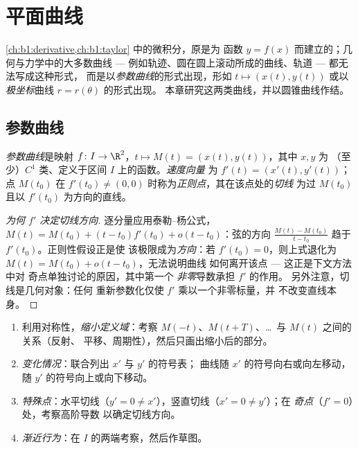 \chapter{平面曲线}\label{ch:b1:curves}

 \cref{ch:b1:derivative,ch:b1:taylor} 中的微积分，原是为
函数 $y = f(x)$ 而建立的；几何与力学中的大多数曲线 ---
例如轨迹、圆在圆上滚动所成的曲线、轨道 --- 都无法写成这种形式，
而是以\emph{参数曲线}的形式出现，形如 $t \mapsto (x(t),
y(t))$ 或以\emph{极坐标}曲线 $r = r(\theta)$ 的形式出现。
本章研究这两类曲线，并以圆锥曲线作结。

\section{参数曲线}

\begin{definition}\label{def:b1:curves:def}
\emph{参数曲线}是映射 $f
\colon I \to \R^2$，$t \mapsto M(t) = (x(t), y(t))$，其中 $x, y$ 为
（至少）$C^1$ 类、定义于区间 $I$ 上的函数。\emph{速度向量}
为 $f'(t) = (x'(t), y'(t))$；点 $M(t_0)$ 在
$f'(t_0) \neq (0,0)$ 时称为\emph{正则点}，其在该点处的\emph{切线}
为过 $M(t_0)$ 且以 $f'(t_0)$ 为方向的直线。
\end{definition}

\begin{proof}[为何 $f'$ 决定切线方向]
逐分量应用泰勒–杨公式，$M(t) = M(t_0) + (t - t_0) f'(t_0) +
o(t - t_0)$：弦的方向 $\frac{M(t) - M(t_0)}{t - t_0}$
趋于 $f'(t_0)$。正则性假设正是使
该极限成为\emph{方向}：若 $f'(t_0) = 0$，则上式退化为
$M(t) = M(t_0) + o(t - t_0)$，无法说明曲线
如何离开该点 --- 这正是下文方法中对
奇点单独讨论的原因，其中第一个
\emph{非零}导数承担 $f'$ 的作用。
另外注意，切线是几何对象：任何
重新参数化仅使 $f'$ 乘以一个非零标量，并
不改变直线本身。
\end{proof}

\begin{method}[参数曲线的研究]\label{met:b1:curves:study}
\begin{enumerate}
  \item 利用对称性，\emph{缩小定义域}：考察
        $M(-t)$、$M(t + T)$、\dots\ 与 $M(t)$ 之间的关系（反射、
        平移、周期性），然后只画出缩小后的部分。
  \item \emph{变化情况}：联合列出 $x'$ 与 $y'$ 的符号表；
        曲线随 $x'$ 的符号向右或向左移动，随 $y'$ 的符号向上或向下移动。
  \item \emph{特殊点}：水平切线（$y' = 0 \neq
        x'$），竖直切线（$x' = 0 \neq y'$）；在
        \emph{奇点}（$f' = 0$）处，考察高阶导数
        以确定切线方向。
  \item \emph{渐近行为}：在 $I$ 的两端考察，然后作草图。
\end{enumerate}
\end{method}

